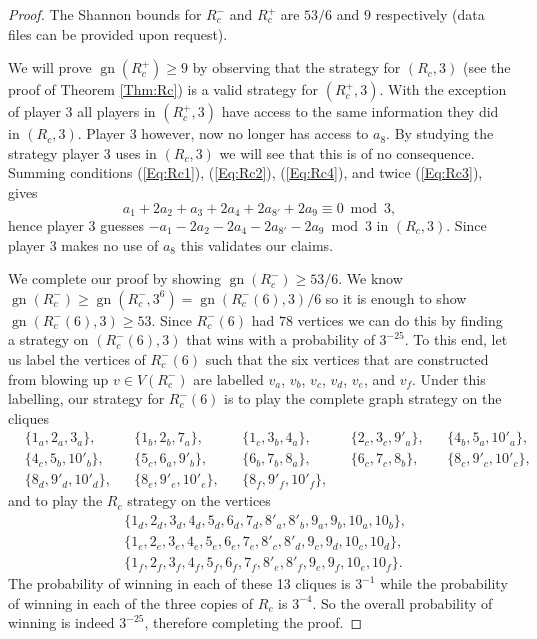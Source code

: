 \documentclass[a4paper, 14pt]{extarticle}
\theoremstyle{plain}
\DeclareMathOperator{\gn}{gn}
\begin{document}
\begin{proof}
The Shannon bounds for $R_c^-$ and $R_c^+$ are $53/6$ and $9$
respectively (data files can be provided upon request).

We will prove $\gn(R_c^+)\geq 9$ by observing that the strategy for
$(R_c,3)$ (see the proof of Theorem \ref{Thm:Rc}) is a valid
strategy for $(R_c^+,3)$. With the exception of player $3$ all
players in $(R_c^+,3)$ have access to the same information they did
in $(R_c,3)$. Player $3$ however, now no longer has access to $a_8$. By studying the strategy player $3$ uses in $(R_c,3)$ we will see
that this is of no consequence. Summing conditions (\ref{Eq:Rc1}),
(\ref{Eq:Rc2}), (\ref{Eq:Rc4}), and twice (\ref{Eq:Rc3}), gives
\[
a_1+2a_2+a_3+2a_4+2a_{8'}+2a_{9} \equiv 0 \bmod 3,
\]
hence player $3$ guesses $-a_1-2a_2-2a_4-2a_{8'}-2a_{9} \bmod 3$ in
$(R_c,3)$. Since player $3$ makes no use of $a_8$ this validates our
claims.

We complete our proof by showing $\gn(R_c^-)\geq 53/6$. We know
$\gn(R_c^-)\geq \gn(R_c^-,3^6) = \gn(R_c^-(6),3)/6$ so it is enough
to show $\gn(R_c^-(6),3)\geq 53$. Since $R_c^-(6)$ had $78$ vertices we can do this by finding a strategy on
$(R_c^-(6),3)$ that wins with a probability of $3^{-25}$. To this end, let us
label the vertices of $R_c^-(6)$ such that the six vertices that are
constructed from blowing up $v\in V(R_c^-)$ are labelled $v_a$,
$v_b$, $v_c$, $v_d$, $v_e$, and $v_f$. Under this labelling, our
strategy for $R_c^-(6)$ is to play the complete graph strategy on
the cliques
\begin{align*}
&\{1_a,2_a,3_a\}, &&\{1_b,2_b,7_a\}, &&\{1_c,3_b,4_a\},
&&\{2_c,3_c,9'_a\}, &&\{4_b,5_a,10'_a\},\\
&\{4_c,5_b,10'_b\}, &&\{5_c,6_a,9'_b\}, &&\{6_b,7_b,8_a\},
&&\{6_c,7_c,8_b\}, &&\{8_c,9'_c,10'_c\},\\
&\{8_d,9'_d,10'_d\}, &&\{8_e,9'_e,10'_e\}, &&\{8_f,9'_f,10'_f\},
\end{align*}
and to play the $R_c$ strategy on the vertices
\begin{align*}
&\{1_d,2_d,3_d,4_d,5_d,6_d,7_d,8'_a,8'_b,9_a,9_b,10_a,10_b\},\\
&\{1_e,2_e,3_e,4_e,5_e,6_e,7_e,8'_c,8'_d,9_c,9_d,10_c,10_d\},\\
&\{1_f,2_f,3_f,4_f,5_f,6_f,7_f,8'_e,8'_f,9_e,9_f,10_e,10_f\}.
\end{align*}
The probability of winning in each of these 13 cliques is $3^{-1}$ while the probability of winning in each of the three copies of $R_c$ is $3^{-4}$. So the overall probability of winning is indeed $3^{-25}$, therefore completing the proof.
\end{proof}
\end{document}
